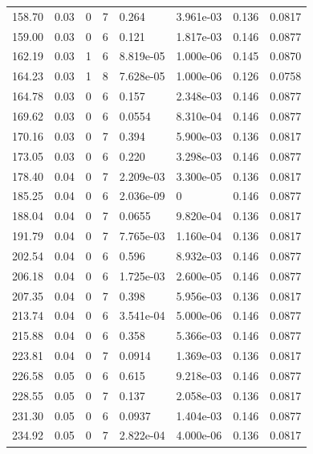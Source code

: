 \documentclass[preview]{standalone}
\begin{document}
{{{\begin{tabular}{L{1.2cm}C{1.2cm} C{0.3cm}C{0.5cm} C{1.4cm}C{1.4cm} C{1.4cm}C{1.4cm}}
  158.70  &  0.03  & 0     &  7 &  0.264  & 3.961e-03  & 0.136 &  0.0817   \\ 
  159.00  &  0.03  & 0     &  6 &  0.121  & 1.817e-03  & 0.146 &  0.0877   \\ 
  162.19  &  0.03  & 1     &  6 &  8.819e-05  & 1.000e-06  & 0.145 &  0.0870   \\ 
  164.23  &  0.03  & 1     &  8 &  7.628e-05  & 1.000e-06  & 0.126 &  0.0758   \\ 
  164.78  &  0.03  & 0     &  6 &  0.157  & 2.348e-03  & 0.146 &  0.0877   \\ 
  169.62  &  0.03  & 0     &  6 &  0.0554  & 8.310e-04  & 0.146 &  0.0877   \\ 
  170.16  &  0.03  & 0     &  7 &  0.394  & 5.900e-03  & 0.136 &  0.0817   \\ 
  173.05  &  0.03  & 0     &  6 &  0.220  & 3.298e-03  & 0.146 &  0.0877   \\ 
  178.40  &  0.04  & 0     &  7 &  2.209e-03  & 3.300e-05  & 0.136 &  0.0817   \\ 
  185.25  &  0.04  & 0     &  6 &  2.036e-09  & 0  & 0.146 &  0.0877   \\ 
  188.04  &  0.04  & 0     &  7 &  0.0655  & 9.820e-04  & 0.136 &  0.0817   \\ 
  191.79  &  0.04  & 0     &  7 &  7.765e-03  & 1.160e-04  & 0.136 &  0.0817   \\ 
  202.54  &  0.04  & 0     &  6 &  0.596  & 8.932e-03  & 0.146 &  0.0877   \\ 
  206.18  &  0.04  & 0     &  6 &  1.725e-03  & 2.600e-05  & 0.146 &  0.0877   \\ 
  207.35  &  0.04  & 0     &  7 &  0.398  & 5.956e-03  & 0.136 &  0.0817   \\ 
  213.74  &  0.04  & 0     &  6 &  3.541e-04  & 5.000e-06  & 0.146 &  0.0877   \\ 
  215.88  &  0.04  & 0     &  6 &  0.358  & 5.366e-03  & 0.146 &  0.0877   \\ 
  223.81  &  0.04  & 0     &  7 &  0.0914  & 1.369e-03  & 0.136 &  0.0817   \\ 
  226.58  &  0.05  & 0     &  6 &  0.615  & 9.218e-03  & 0.146 &  0.0877   \\ 
  228.55  &  0.05  & 0     &  7 &  0.137  & 2.058e-03  & 0.136 &  0.0817   \\ 
  231.30  &  0.05  & 0     &  6 &  0.0937  & 1.404e-03  & 0.146 &  0.0877   \\ 
  234.92  &  0.05  & 0     &  7 &  2.822e-04  & 4.000e-06  & 0.136 &  0.0817   \\ 

\end{tabular}}}}
\end{document}

